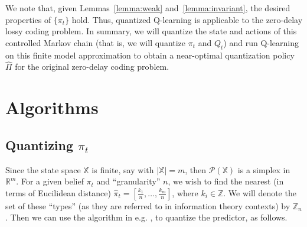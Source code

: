 \documentclass{article}
\begin{document}
We note that, given Lemmas~\ref{lemma:weak} and~\ref{lemma:invariant}, the desired properties of \( \{\pi_t\} \) hold. Thus, quantized Q-learning is applicable to the zero-delay lossy coding problem. In summary, we will quantize the state and actions of this controlled Markov chain (that is, we will quantize \( \pi_t \) and \( Q_t \)) and run Q-learning on this finite model approximation to obtain a near-optimal quantization policy \( \hat{\Pi} \) for the original zero-delay coding problem.

\section{Algorithms}

\subsection{Quantizing \( \pi_t \)}\label{algorithm1}
Since the state space \( \mathbb{X} \) is finite, say with \( |\mathbb{X}| = m \), then \( \mathcal{P}(\mathbb{X}) \) is a simplex in \( \mathbb{R}^m \). For a given belief \( \pi_t \) and ``granularity'' \( n \), we wish to find the nearest (in terms of Eucilidean distance) \( \hat{\pi}_t = [\frac{k_1}{n}, \ldots, \frac{k_m}{n}] \), where \( k_i \in \mathbb{Z} \). We will denote the set of these ``types'' (as they are referred to in information theory contexts) by \( \mathbb{Z}_n \). Then we can use the algorithm in e.g. \cite{Reznik}, \cite{Saldi} to quantize the predictor, as follows. %

\newcommand\showline{\stepcounter{linenum}\thelinenum}
\end{document}
